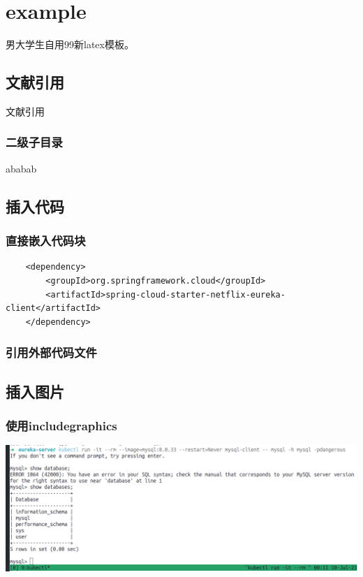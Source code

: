 \section{example}

男大学生自用99新latex模板。

\subsection{文献引用}

文献引用\cite[text]{example-bib}

\subsubsection{二级子目录}

ababab


\subsection{插入代码}


\subsubsection{直接嵌入代码块}

\begin{lstlisting}
    <dependency>
        <groupId>org.springframework.cloud</groupId>
        <artifactId>spring-cloud-starter-netflix-eureka-client</artifactId>
    </dependency>
\end{lstlisting}


\subsubsection{引用外部代码文件}




\subsection{插入图片}

\subsubsection{使用{includegraphics}}


\includegraphics[width=0.9\linewidth]{figures/example.png}


